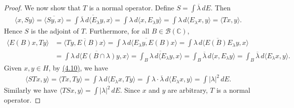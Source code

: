 \documentclass{article}
\begin{document}
\begin{proof}
We now show that $T$ is a normal operator. Define $S=\int\overline{\lambda}\,dE$. Then
\begin{align*}
	\langle x,Sy\rangle = \overline{\langle Sy,x\rangle} = \overline{\int\overline{\lambda}\,d\langle E_\lambda y,x\rangle} = \int\lambda\, d\langle x,E_\lambda y\rangle = \int\lambda\, d\langle E_\lambda x, y\rangle = \langle Tx,y\rangle.
\end{align*}
Hence $S$ is the adjoint of $T$. Furthermore, for all $B\in\mathscr{B}(\mathbb{C})$,
\begin{align*}
	\langle E(B) x,Ty\rangle &= \overline{\langle Ty,E(B)x\rangle} = \overline{\int \lambda\, d\langle E_\lambda y,E(B)x\rangle} = \overline{\int \lambda\, d\langle E(B)E_\lambda y,x\rangle}\\
	&= \overline{\int \lambda\, d\langle E(B\cap\lambda) y,x\rangle}
	= \overline{\int_B \lambda\, d\langle E_\lambda y,x\rangle} = \int_B \overline{\lambda}\, d\langle x, E_\lambda y\rangle = \int_B \overline{\lambda}\, d\langle E_\lambda x,y\rangle. \tag{4.10}\label{eq:4.10}
\end{align*}
Given $x,y\in H$, by \hyperref[eq:4.10]{(4.10)}, we have
\begin{align*}
	\langle STx,y\rangle = \langle Tx,Ty\rangle = \int\lambda\,d\langle E_\lambda x,Ty\rangle = \int\lambda\cdot\overline{\lambda}\,d\langle E_\lambda x,y\rangle = \int\vert\lambda\vert^2\,dE.
\end{align*}
Similarly we have $\langle TSx,y\rangle=\int\vert\lambda\vert^2\,dE$. Since $x$ and $y$ are arbitrary, $T$ is a normal operator.
\end{proof}
\end{document}

